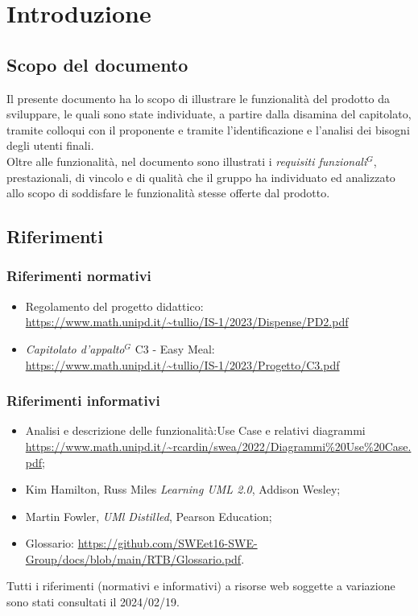 
\section{Introduzione}

\subsection{Scopo del documento}

Il presente documento ha lo scopo di illustrare le funzionalità del prodotto da sviluppare,
le quali sono state individuate, a partire dalla disamina del capitolato, tramite colloqui con
il proponente e tramite l'identificazione e l'analisi dei bisogni degli utenti finali.\\
Oltre alle funzionalità, nel documento sono illustrati i \emph{requisiti funzionali}$^{G}$, prestazionali, di
vincolo e di qualità che il gruppo ha individuato ed analizzato allo scopo di soddisfare le
funzionalità stesse offerte dal prodotto.

\subsection{Riferimenti}
\subsubsection{Riferimenti normativi}

\begin{itemize}
    \item Regolamento del progetto didattico: \\
    \url{https://www.math.unipd.it/~tullio/IS-1/2023/Dispense/PD2.pdf}
  \item \emph{Capitolato d’appalto}$^{G}$ C3 - Easy Meal: \\
    \url{https://www.math.unipd.it/~tullio/IS-1/2023/Progetto/C3.pdf}
\end{itemize}

\subsubsection{Riferimenti informativi}

\begin{itemize}
    \item Analisi e descrizione delle funzionalità:Use Case e relativi diagrammi \url{https://www.math.unipd.it/~rcardin/swea/2022/Diagrammi%20Use%20Case.pdf};
    \item Kim Hamilton, Russ Miles \emph{Learning UML 2.0}, Addison Wesley;
    \item Martin Fowler, \emph{UMl Distilled}, Pearson Education;
    \item Glossario: \url{https://github.com/SWEet16-SWE-Group/docs/blob/main/RTB/Glossario.pdf}.
\end{itemize}

Tutti i riferimenti (normativi e informativi) a risorse web soggette a variazione sono stati consultati il 2024/02/19.
